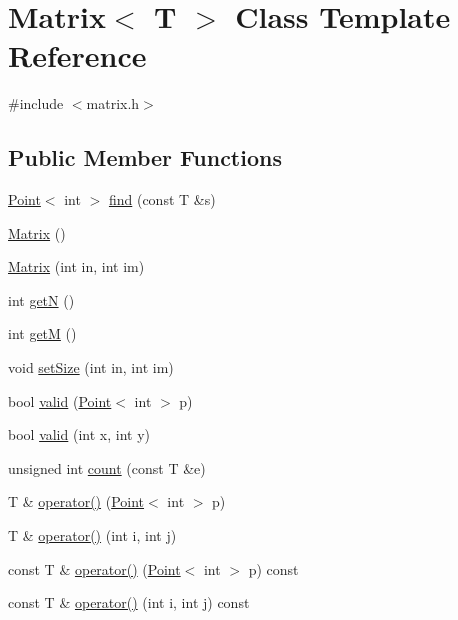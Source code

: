 \hypertarget{class_matrix}{\section{Matrix$<$ T $>$ Class Template Reference}
\label{class_matrix}
}


{\ttfamily \#include $<$matrix.\-h$>$}

\subsection*{Public Member Functions}
\begin{DoxyCompactItemize}
\item 
\hyperlink{class_point}{Point}$<$ int $>$ \hyperlink{class_matrix_a0a79b7f8231d28240e7933a4be5f74db}{find} (const T \&s)
\item 
\hyperlink{class_matrix_a9d567e3a121b1be0c3f9c461cab524fe}{Matrix} ()
\item 
\hyperlink{class_matrix_aa3941b8ab4188eafa9899d4e6555d07c}{Matrix} (int in, int im)
\item 
int \hyperlink{class_matrix_adab477691e1f82e57803f84ad9db54c1}{get\-N} ()
\item 
int \hyperlink{class_matrix_aac104aabee056f18ac42e7df2e536cfc}{get\-M} ()
\item 
void \hyperlink{class_matrix_ad4a283dbbecf20a6f0014ca0bc5aec00}{set\-Size} (int in, int im)
\item 
bool \hyperlink{class_matrix_aa454979c3339d4ee8d9e1e98f46066e3}{valid} (\hyperlink{class_point}{Point}$<$ int $>$ p)
\item 
bool \hyperlink{class_matrix_a0e80a5b83d4da5bf95efc789cb854144}{valid} (int x, int y)
\item 
unsigned int \hyperlink{class_matrix_ab694b737f2a80b72417e187d2b8a7d08}{count} (const T \&e)
\item 
T \& \hyperlink{class_matrix_ad0a2f9022a43d65aeb5891cb1be9d239}{operator()} (\hyperlink{class_point}{Point}$<$ int $>$ p)
\item 
T \& \hyperlink{class_matrix_ae8809f61744c5c424b83236ffab161a0}{operator()} (int i, int j)
\item 
const T \& \hyperlink{class_matrix_a9752af8436bfd238da5118c7cc774427}{operator()} (\hyperlink{class_point}{Point}$<$ int $>$ p) const 
\item 
const T \& \hyperlink{class_matrix_a629dc548c89c21ba95c7693c44b67f00}{operator()} (int i, int j) const 
\end{DoxyCompactItemize}
